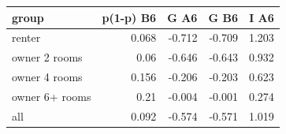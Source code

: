 \begin{tabular}{lrrrr}
\toprule
group & p(1-p) B6 & G A6 & G B6 & I A6 \\
\midrule
renter & 0.068 & -0.712 & -0.709 & 1.203 \\
owner 2 rooms & 0.06 & -0.646 & -0.643 & 0.932 \\
owner 4 rooms & 0.156 & -0.206 & -0.203 & 0.623 \\
owner 6+ rooms & 0.21 & -0.004 & -0.001 & 0.274 \\
all & 0.092 & -0.574 & -0.571 & 1.019 \\
\bottomrule
\end{tabular}
